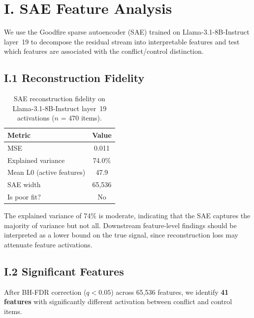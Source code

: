 \documentclass[accepted]{article}
\begin{document}

\section*{I. SAE Feature Analysis}
\label{sec:appendix_sae}

We use the Goodfire sparse autoencoder (SAE) trained on
Llama-3.1-8B-Instruct layer~19 to decompose the residual stream
into interpretable features and test which features are associated
with the conflict/control distinction.

\subsection*{I.1 Reconstruction Fidelity}

\begin{table}[ht]
\centering
\caption{SAE reconstruction fidelity on Llama-3.1-8B-Instruct
  layer~19 activations ($n$ = 470 items).}
\label{tab:sae_fidelity}
\vspace{4pt}
\small
\begin{tabular}{lc}
\toprule
\textbf{Metric} & \textbf{Value} \\
\midrule
MSE                  & 0.011 \\
Explained variance   & 74.0\% \\
Mean L0 (active features) & 47.9 \\
SAE width            & 65{,}536 \\
Is poor fit?         & No \\
\bottomrule
\end{tabular}
\end{table}

\noindent The explained variance of 74\% is moderate, indicating that
the SAE captures the majority of variance but not all.  Downstream
feature-level findings should be interpreted as a lower bound on
the true signal, since reconstruction loss may attenuate feature
activations.

\subsection*{I.2 Significant Features}

After BH-FDR correction ($q < 0.05$) across 65{,}536 features, we
identify \textbf{41 features} with significantly different activation
between conflict and control items.
\end{document}
